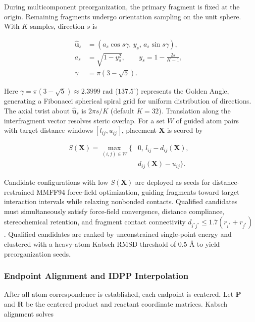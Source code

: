 During multicomponent preorganization, the primary fragment is fixed at the origin. Remaining fragments undergo orientation sampling on the unit sphere. With $K$ samples, direction $s$ is

\begin{equation}\label{eq:methods-05}
\begin{aligned}
\hat{\mathbf{u}}_s&=(a_s\cos s\gamma,\,y_s,\,a_s\sin s\gamma),\\
a_s&=\sqrt{1-y_s^2},\qquad y_s=1-\frac{2s}{K-1},\\
\gamma&=\pi(3-\sqrt{5}).
\end{aligned}
\end{equation}

Here $\gamma=\pi(3-\sqrt{5})\approx 2.3999\text{ rad}$ ($137.5^\circ$) represents the Golden Angle, generating a Fibonacci spherical spiral grid for uniform distribution of directions. The axial twist about $\hat{\mathbf{u}}_s$ is $2\pi s/K$ (default $K=32$). Translation along the interfragment vector resolves steric overlap. For a set $W$ of guided atom pairs with target distance windows $[l_{ij},u_{ij}]$, placement $\mathbf{X}$ is scored by

\begin{equation}\label{eq:methods-06}
\begin{aligned}
S(\mathbf{X})=\max_{(i,j)\in W}\{&0,\,l_{ij}-d_{ij}(\mathbf{X}),\\
&d_{ij}(\mathbf{X})-u_{ij}\}.
\end{aligned}
\end{equation}

Candidate configurations with low $S(\mathbf{X})$ are deployed as seeds for distance-restrained MMFF94 force-field optimization, guiding fragments toward target interaction intervals while relaxing nonbonded contacts. Qualified candidates must simultaneously satisfy force-field convergence, distance compliance, stereochemical retention, and fragment contact connectivity $d_{i^*j^*}\le 1.7(r_{i^*}+r_{j^*})$. Qualified candidates are ranked by unconstrained single-point energy and clustered with a heavy-atom Kabsch RMSD threshold of 0.5 Å to yield preorganization seeds.

\subsubsection{Endpoint Alignment and IDPP Interpolation}
After all-atom correspondence is established, each endpoint is centered. Let $\mathbf{P}$ and $\mathbf{R}$ be the centered product and reactant coordinate matrices. Kabsch alignment solves

